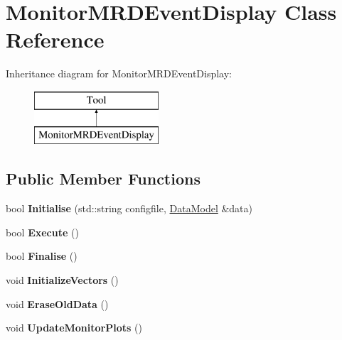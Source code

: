 \hypertarget{classMonitorMRDEventDisplay}{\section{Monitor\-M\-R\-D\-Event\-Display Class Reference}
\label{classMonitorMRDEventDisplay}
}
Inheritance diagram for Monitor\-M\-R\-D\-Event\-Display\-:\begin{figure}[H]
\begin{center}
\leavevmode
\includegraphics[height=2.000000cm]{classMonitorMRDEventDisplay}
\end{center}
\end{figure}
\subsection*{Public Member Functions}
\begin{DoxyCompactItemize}
\item 
\hypertarget{classMonitorMRDEventDisplay_a35e5b18f01d2249fe3d30a90c94a0692}{bool {\bfseries Initialise} (std\-::string configfile, \hyperlink{classDataModel}{Data\-Model} \&data)}\label{classMonitorMRDEventDisplay_a35e5b18f01d2249fe3d30a90c94a0692}

\item 
\hypertarget{classMonitorMRDEventDisplay_aa0046209bda6d93bd001b3326a6ec9ee}{bool {\bfseries Execute} ()}\label{classMonitorMRDEventDisplay_aa0046209bda6d93bd001b3326a6ec9ee}

\item 
\hypertarget{classMonitorMRDEventDisplay_a4241c27d6fbffa510cf2ab765367d96f}{bool {\bfseries Finalise} ()}\label{classMonitorMRDEventDisplay_a4241c27d6fbffa510cf2ab765367d96f}

\item 
\hypertarget{classMonitorMRDEventDisplay_af0cca0c4edd7afac1e6c5c6094e984e1}{void {\bfseries Initialize\-Vectors} ()}\label{classMonitorMRDEventDisplay_af0cca0c4edd7afac1e6c5c6094e984e1}

\item 
\hypertarget{classMonitorMRDEventDisplay_a39e8832209afa666872d8b3dfc043ea0}{void {\bfseries Erase\-Old\-Data} ()}\label{classMonitorMRDEventDisplay_a39e8832209afa666872d8b3dfc043ea0}

\item 
\hypertarget{classMonitorMRDEventDisplay_a939860a98875349b13946c622ca3fe41}{void {\bfseries Update\-Monitor\-Plots} ()}\label{classMonitorMRDEventDisplay_a939860a98875349b13946c622ca3fe41}

\end{DoxyCompactItemize}



